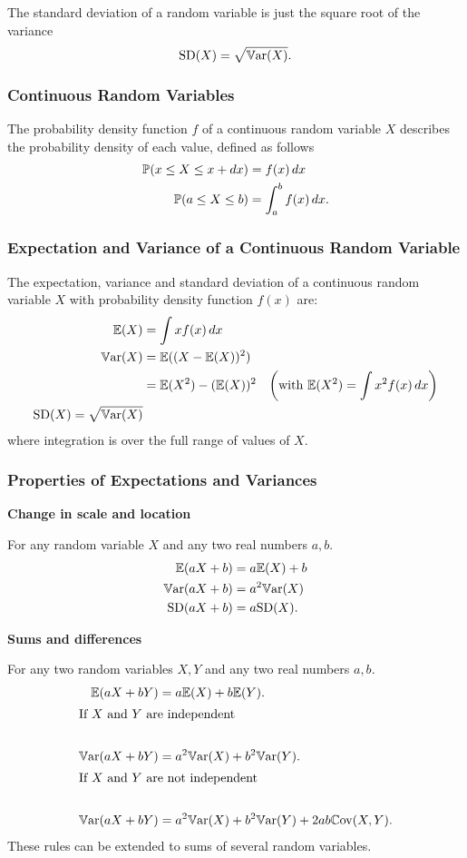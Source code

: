 \documentclass[10pt, a4paper]{article}
\begin{document}
The standard deviation of a random variable is just the square root of the variance
\[
\mathrm{SD}(X) = \sqrt{\Var(X)}.
\]

\subsubsection{Continuous Random Variables}
The probability density function $f$ of a continuous random variable $X$ describes the probability density of each value,
defined as follows
\begin{align*}
    \P(x \leq X \leq x + dx) &= f(x)\,dx \\
    \P(a \leq X \leq b) &= \int_{a}^{b}f(x)\,dx.
\end{align*}

\subsubsection{Expectation and Variance of a Continuous Random Variable}
The expectation,
variance and standard deviation of a continuous random variable $X$ with probability density function $f(x)$ are:
\begin{align*}
    \E(X) &= \int xf(x)\,dx \\
    \Var(X) &= \E((X - \E(X)) ^ 2) \\
    &= \E(X ^ 2) - (\E(X)) ^ 2 &\left(\text{with } \E(X ^ 2) = \int x ^ 2f(x)\,dx\right) \\
    \mathrm{SD}(X) = \sqrt{\Var(X)}
\end{align*}
where integration is over the full range of values of $X$.

\subsubsection{Properties of Expectations and Variances}
\textbf{Change in scale and location}

For any random variable $X$ and any two real numbers $a, b$.
\begin{align*}
    \E(aX + b) &= a\E(X) + b \\
    \Var(aX + b) &= a ^ 2\Var(X) \\
    \mathrm{SD}(aX + b) &= a\mathrm{SD}(X).
\end{align*}

\textbf{Sums and differences}

For any two random variables $X, Y$ and any two real numbers $a, b$.
\begin{align*}
    \E(aX + bY) &= a\E(X) + b\E(Y). \\
    \intertext{If $X$ and $Y$ are independent} \\
    \Var(aX + bY) &= a ^ 2\Var(X) + b ^ 2\Var(Y). \\
    \intertext{If $X$ and $Y$ are not independent} \\
    \Var(aX + bY) &= a ^ 2\Var(X) + b ^ 2\Var(Y) + 2ab\Cov(X, Y).
\end{align*}
These rules can be extended to sums of several random variables.
\end{document}
